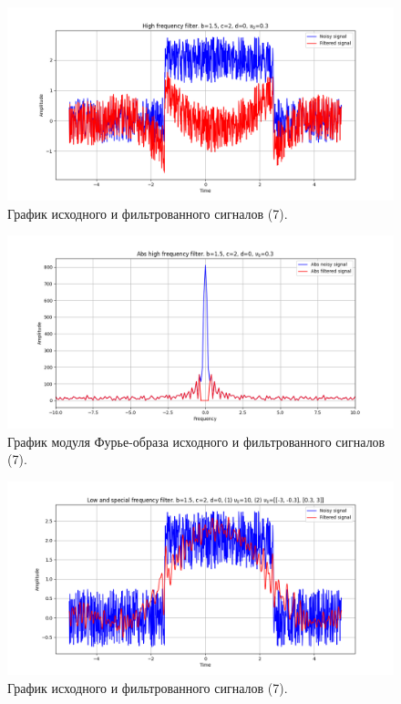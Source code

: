 \documentclass[a4paper, 12pt]{article}
\begin{document}
    \begin{figure}[H]
        \centering
        \includegraphics[scale=0.48]{7_2_u_flt_u_nospec.png}
        \captionsetup{skip=0pt}
        \caption{График исходного и фильтрованного сигналов (7).}
        \label{fig:ndfngdfig}
    \end{figure}
    \begin{figure}[!htb]
        \centering
        \includegraphics[scale=0.48]{7_2_abs_u_U_nospec.png}
        \captionsetup{skip=0pt}
        \caption{График модуля Фурье-образа исходного и фильтрованного сигналов (7).}
        \label{fig:jdfnjne}
    \end{figure}
    \begin{figure}[!htb]
        \centering
        \includegraphics[scale=0.48]{7_3_u_flt_u_nospec.png}
        \captionsetup{skip=0pt}
        \caption{График исходного и фильтрованного сигналов (7).}
        \label{fig:fsdjflsfl}
    \end{figure}
\end{document}
